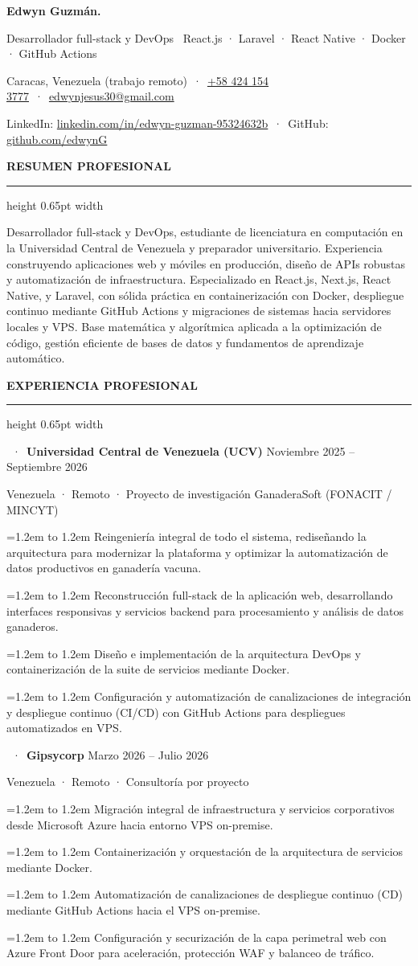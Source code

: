 \documentclass[10pt,a4paper]{article}
\makeatletter
\newlength{\SpaceAboveSection}
\newlength{\SpaceSectionTextToLine}
\newlength{\SpaceSectionLineToContent}
\newlength{\SpaceBetweenJobs}
\newlength{\SpaceJobTitleToSub}
\newlength{\SpaceJobSubToItems}
\newlength{\SpaceBetweenItems}
\newcommand{\cvName}{Edwyn Guzmán}
\newcommand{\cvRole}{Desarrollador full-stack y DevOps \textbar\ React.js · Laravel · React Native · Docker · GitHub Actions}
\newcommand{\cvLocation}{Caracas, Venezuela (trabajo remoto)}
\newcommand{\cvPhone}{+58 424 154 3777}
\newcommand{\cvPhoneLink}{+584241543777}
\newcommand{\cvEmail}{edwynjesus30@gmail.com}
\newcommand{\cvLinkedInUser}{linkedin.com/in/edwyn-guzman-95324632b}
\newcommand{\cvLinkedInLink}{https://linkedin.com/in/edwyn-guzman-95324632b}
\newcommand{\cvGitHubUser}{github.com/edwynG}
\newcommand{\cvGitHubLink}{https://github.com/edwynG}
\newcommand{\cvdot}{\textcolor{subsecondary}{~·~}}
\newcommand{\makecvheader}{%
  {\fontsize{24pt}{29pt}\bfseries \cvName{\color{dotaccent}.}}\par\vspace{0.26cm}%
  {\fontsize{10.2pt}{14.5pt}\color{subtext}\selectfont \cvRole}\par\vspace{0.22cm}%
  {\fontsize{9.4pt}{13.5pt}\color{subsecondary}\selectfont \cvLocation\cvdot\href{tel:\cvPhoneLink}{\color{subsecondary}\cvPhone}\cvdot\href{mailto:\cvEmail}{\color{dotaccent}\cvEmail}}\par\vspace{0.10cm}%
  {\fontsize{9.4pt}{13.5pt}\color{subsecondary}\selectfont LinkedIn: \href{\cvLinkedInLink}{\color{subsecondary}\cvLinkedInUser}\cvdot GitHub: \href{\cvGitHubLink}{\color{subsecondary}\cvGitHubUser}}\par%
}
\newcommand{\cvsection}[1]{%
  \vspace{\SpaceAboveSection}%
  {\color{accent}\bfseries\fontsize{10.2pt}{12pt}\addfontfeatures{LetterSpace=9.0}\selectfont #1}\par\nopagebreak%
  \vspace{\SpaceSectionTextToLine}%
  {\color{linecolor}\hrule height 0.65pt width \linewidth}\par\nopagebreak%
  \vspace{\SpaceSectionLineToContent}%
}
\newcommand{\cventry}[4]{%
  {\fontsize{9.8pt}{13.5pt}\selectfont{\bfseries #1}\cvdot{\color{accent}\bfseries #2} \hfill {\color{subsecondary}\small #4}}\par%
  \vspace{\SpaceJobTitleToSub}%
  {\color{subsecondary}\small #3}\par%
  \vspace{\SpaceJobSubToItems}%
}
\newcommand{\cvitem}[1]{%
  \par\hangindent=1.2em\hangafter=1\noindent
  \hbox to 1.2em{\raisebox{0.05ex}{\small\textbullet}\hss}%
  {\fontsize{9.6pt}{14.5pt}\selectfont #1}\par%
  \vspace{\SpaceBetweenItems}%
}
\newcommand{\jobsep}{\vspace{\SpaceBetweenJobs}}
\makeatother
\begin{document}
\color{textdark}


\makecvheader

\cvsection{RESUMEN PROFESIONAL}

{\fontsize{9.6pt}{14.8pt}\selectfont
  Desarrollador full-stack y DevOps, estudiante de licenciatura en computación en la Universidad Central de Venezuela y preparador universitario. Experiencia construyendo aplicaciones web y móviles en producción, diseño de APIs robustas y automatización de infraestructura. Especializado en React.js, Next.js, React Native, y Laravel, con sólida práctica en containerización con Docker, despliegue continuo mediante GitHub Actions y migraciones de sistemas hacia servidores locales y VPS. Base matemática y algorítmica aplicada a la optimización de código, gestión eficiente de bases de datos y fundamentos de aprendizaje automático.
}\par

\cvsection{EXPERIENCIA PROFESIONAL}

\cventry{Desarrollador full-stack y DevOps}{Universidad Central de Venezuela (UCV)}{Venezuela · Remoto · Proyecto de investigación GanaderaSoft (FONACIT / MINCYT)}{Noviembre 2025 – Septiembre 2026}
\cvitem{Reingeniería integral de todo el sistema, rediseñando la arquitectura para modernizar la plataforma y optimizar la automatización de datos productivos en ganadería vacuna.}
\cvitem{Reconstrucción full-stack de la aplicación web, desarrollando interfaces responsivas y servicios backend para procesamiento y análisis de datos ganaderos.}
\cvitem{Diseño e implementación de la arquitectura DevOps y containerización de la suite de servicios mediante Docker.}
\cvitem{Configuración y automatización de canalizaciones de integración y despliegue continuo (CI/CD) con GitHub Actions para despliegues automatizados en VPS.}

\jobsep

\cventry{Consultor DevOps y cloud}{Gipsycorp}{Venezuela · Remoto · Consultoría por proyecto}{Marzo 2026 – Julio 2026}
\cvitem{Migración integral de infraestructura y servicios corporativos desde Microsoft Azure hacia entorno VPS on-premise.}
\cvitem{Containerización y orquestación de la arquitectura de servicios mediante Docker.}
\cvitem{Automatización de canalizaciones de despliegue continuo (CD) mediante GitHub Actions hacia el VPS on-premise.}
\cvitem{Configuración y securización de la capa perimetral web con Azure Front Door para aceleración, protección WAF y balanceo de tráfico.}
\end{document}
